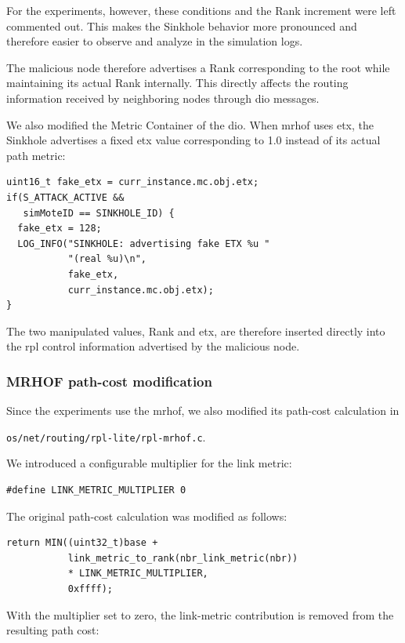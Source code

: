 For the experiments, however, these conditions and the Rank increment were left commented out.
This makes the Sinkhole behavior more pronounced and therefore easier to observe and analyze in the simulation logs.

The malicious node therefore advertises a Rank corresponding to the root while maintaining its actual Rank internally.
This directly affects the routing information received by neighboring nodes through \gls{dio} messages.

We also modified the Metric Container of the \gls{dio}.
When \gls{mrhof} uses \gls{etx}, the Sinkhole advertises a fixed \gls{etx} value corresponding to 1.0 instead of its actual path metric:

\begin{verbatim}
uint16_t fake_etx = curr_instance.mc.obj.etx;
if(S_ATTACK_ACTIVE &&
   simMoteID == SINKHOLE_ID) {
  fake_etx = 128;
  LOG_INFO("SINKHOLE: advertising fake ETX %u "
           "(real %u)\n",
           fake_etx,
           curr_instance.mc.obj.etx);
}
\end{verbatim}

The two manipulated values, Rank and \gls{etx}, are therefore inserted directly
into the \gls{rpl} control information advertised by the malicious node.

\subsubsection{MRHOF path-cost modification}
\label{subsubsec:mrhof_implementation}
Since the experiments use the \gls{mrhof}, we also modified its path-cost calculation in

\texttt{os/net/routing/rpl-lite/rpl-mrhof.c}.

We introduced a configurable multiplier for the link metric:

\begin{verbatim}
#define LINK_METRIC_MULTIPLIER 0
\end{verbatim}

The original path-cost calculation was modified as follows:

\begin{verbatim}
return MIN((uint32_t)base +
           link_metric_to_rank(nbr_link_metric(nbr))
           * LINK_METRIC_MULTIPLIER,
           0xffff);
\end{verbatim}

With the multiplier set to zero, the link-metric contribution is removed from the resulting path cost:

